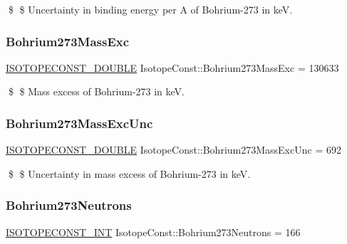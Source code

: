 \$ \$ Uncertainty in binding energy per A of Bohrium-\/273 in keV. \mbox{\label{group___isotope_const-_bohrium-_bh273_ga265906a1589c12826012ce2977ab6633}} 
\subsubsection{\texorpdfstring{Bohrium273\+Mass\+Exc}{Bohrium273MassExc}}
{\footnotesize\ttfamily \mbox{\hyperlink{group___isotope_const-_macros_ga8f45a7272ce02c0b4c65c44636ed719a}{I\+S\+O\+T\+O\+P\+E\+C\+O\+N\+S\+T\+\_\+\+D\+O\+U\+B\+LE}} Isotope\+Const\+::\+Bohrium273\+Mass\+Exc = 130633}

\$ \$ Mass excess of Bohrium-\/273 in keV. \mbox{\label{group___isotope_const-_bohrium-_bh273_gad4af3af1115bbe3e086f0297dc9b02c8}} 
\subsubsection{\texorpdfstring{Bohrium273\+Mass\+Exc\+Unc}{Bohrium273MassExcUnc}}
{\footnotesize\ttfamily \mbox{\hyperlink{group___isotope_const-_macros_ga8f45a7272ce02c0b4c65c44636ed719a}{I\+S\+O\+T\+O\+P\+E\+C\+O\+N\+S\+T\+\_\+\+D\+O\+U\+B\+LE}} Isotope\+Const\+::\+Bohrium273\+Mass\+Exc\+Unc = 692}

\$ \$ Uncertainty in mass excess of Bohrium-\/273 in keV. \mbox{\label{group___isotope_const-_bohrium-_bh273_ga2f7fa51ef872b5c4e025e4442e365c8a}} 
\subsubsection{\texorpdfstring{Bohrium273\+Neutrons}{Bohrium273Neutrons}}
{\footnotesize\ttfamily \mbox{\hyperlink{group___isotope_const-_macros_ga5f18360b3e99483a35c32d789e62621c}{I\+S\+O\+T\+O\+P\+E\+C\+O\+N\+S\+T\+\_\+\+I\+NT}} Isotope\+Const\+::\+Bohrium273\+Neutrons = 166}


